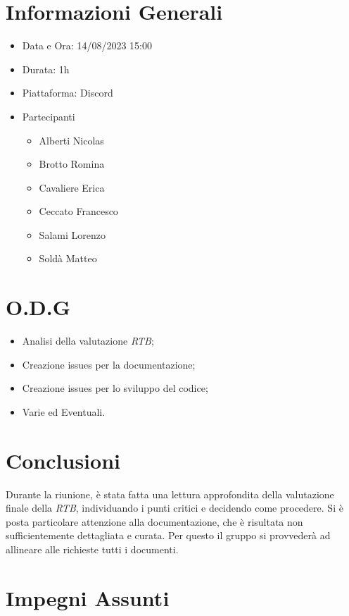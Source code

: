 \documentclass[a4paper, 12pt]{article}
\begin{document}
\makefrontpage

\section*{Informazioni Generali}
\begin{itemize}
    \item Data e Ora: 14/08/2023 15:00
    \item Durata: 1h
    \item Piattaforma: Discord
    \item Partecipanti
    \begin{itemize}
        \item Alberti Nicolas
        \item Brotto Romina
        \item Cavaliere Erica
        \item Ceccato Francesco
        \item Salami Lorenzo
        \item Soldà Matteo
    \end{itemize}
\end{itemize}

\section*{O.D.G}
\begin{itemize}
    \item Analisi della valutazione \textit{RTB};
    \item Creazione issues per la documentazione;
    \item Creazione issues per lo sviluppo del codice;
    \item Varie ed Eventuali.
\end{itemize}

\section*{Conclusioni}
Durante la riunione, è stata fatta una lettura approfondita della valutazione finale della \textit{RTB}, individuando i punti critici e decidendo come procedere.
Si è posta particolare attenzione alla documentazione, che è risultata non sufficientemente dettagliata e curata. Per questo il gruppo si provvederà ad allineare alle richieste tutti i documenti.  

\section*{Impegni Assunti}
\end{document}
